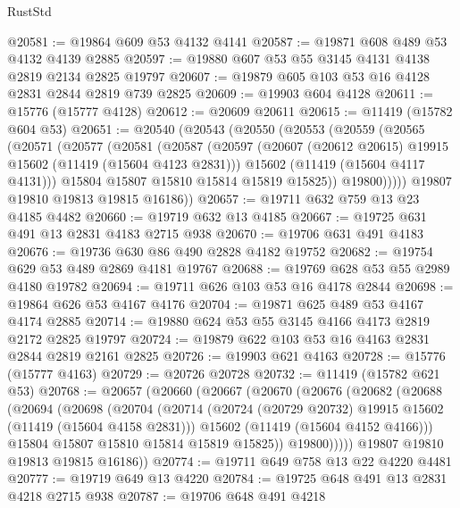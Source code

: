 \begin{lexlean}{RustStd}
\begin{coremodule}
@20581 := @19864 @609 @53 @4132 @4141
@20587 := @19871 @608 @489 @53 @4132 @4139 @2885
@20597 := @19880 @607 @53 @55 @3145 @4131 @4138 @2819 @2134 @2825 @19797
@20607 := @19879 @605 @103 @53 @16 @4128 @2831 @2844 @2819 @739 @2825
@20609 := @19903 @604 @4128
@20611 := @15776 (@15777 @4128)
@20612 := @20609 @20611
@20615 := @11419 (@15782 @604 @53)
@20651 := @20540
    (@20543
      (@20550
        (@20553
          (@20559
            (@20565
              (@20571
                (@20577
                  (@20581
                    (@20587
                      (@20597
                        (@20607 (@20612 @20615) @19915 @15602 (@11419 (@15604 @4123 @2831)))
                        @15602
                        (@11419 (@15604 @4117 @4131)))
                      @15804
                      @15807
                      @15810
                      @15814
                      @15819
                      @15825))
                  @19800)))))
        @19807
        @19810
        @19813
        @19815
        @16186))
@20657 := @19711 @632 @759 @13 @23 @4185 @4482
@20660 := @19719 @632 @13 @4185
@20667 := @19725 @631 @491 @13 @2831 @4183 @2715 @938
@20670 := @19706 @631 @491 @4183
@20676 := @19736 @630 @86 @490 @2828 @4182 @19752
@20682 := @19754 @629 @53 @489 @2869 @4181 @19767
@20688 := @19769 @628 @53 @55 @2989 @4180 @19782
@20694 := @19711 @626 @103 @53 @16 @4178 @2844
@20698 := @19864 @626 @53 @4167 @4176
@20704 := @19871 @625 @489 @53 @4167 @4174 @2885
@20714 := @19880 @624 @53 @55 @3145 @4166 @4173 @2819 @2172 @2825 @19797
@20724 := @19879 @622 @103 @53 @16 @4163 @2831 @2844 @2819 @2161 @2825
@20726 := @19903 @621 @4163
@20728 := @15776 (@15777 @4163)
@20729 := @20726 @20728
@20732 := @11419 (@15782 @621 @53)
@20768 := @20657
    (@20660
      (@20667
        (@20670
          (@20676
            (@20682
              (@20688
                (@20694
                  (@20698
                    (@20704
                      (@20714
                        (@20724 (@20729 @20732) @19915 @15602 (@11419 (@15604 @4158 @2831)))
                        @15602
                        (@11419 (@15604 @4152 @4166)))
                      @15804
                      @15807
                      @15810
                      @15814
                      @15819
                      @15825))
                  @19800)))))
        @19807
        @19810
        @19813
        @19815
        @16186))
@20774 := @19711 @649 @758 @13 @22 @4220 @4481
@20777 := @19719 @649 @13 @4220
@20784 := @19725 @648 @491 @13 @2831 @4218 @2715 @938
@20787 := @19706 @648 @491 @4218

\end{coremodule}
\end{lexlean}

